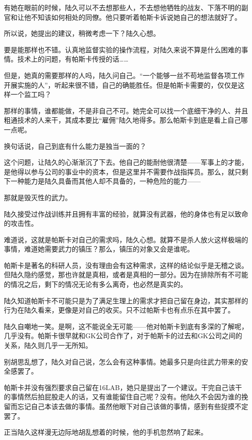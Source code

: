 有她在眼前的时候，陆久可以不去想那些人，不去想他牺牲的战友、下落不明的副官和让他不知该如何相处的同僚。他只要听着帕斯卡诉说她自己的想法就好了。

所以说，她提出的建议，稍微考虑一下？陆久心想。

要是能那样也不错。认真地监督实验的操作流程，对陆久来说不算是什么困难的事情。技术上的问题，有帕斯卡传授的话……

但是，她真的需要那样的人吗，陆久问自己。“一个能够一丝不苟地监督各项工作开展实施的人”，听起来很不错，自己的确能胜任。但是帕斯卡需要的，仅仅是这样一个监工吗？

那样的事情，谁都能做，不是非自己不可。她完全可以找一个底细干净的人、并且粗通技术的人来干，其成本要比“雇佣”陆久地得多。那么帕斯卡到底是看上自己哪一点呢。

换句话说，自己到底有什么能力是独当一面的？

这个问题，让陆久的心渐渐沉了下去。他自己的能耐他很清楚——军事上的才能，是他得以参与公司的事业中的资本，但是这里并不需要作战指挥员。那么，就只剩下一种能力是陆久具备而其他人却不具备的，一种危险的能力——

那就是毁灭性的武力。

陆久接受过作战训练并且拥有丰富的经验，就算没有武器，他的身体也有足以致命的攻击性。

难道说，这就是帕斯卡对自己的需求吗，陆久心想。就算不是杀人放火这样极端的事情，难道她需要武力的镇压？那么，镇压的对象又会是谁呢。

帕斯卡是著名的科研人员，没有理由会有这种需求，这样的结论似乎是无稽之谈。但陆久隐约感觉，那也许就是真相，或者是真相的一部分。因为在排除所有不可能的情况之后，剩下的情况无论有多么离奇，也必然是真实的。

陆久知道帕斯卡不可能只是为了满足生理上的需求才把自己留在身边，其实那样的行为在陆久看来，更像是对自己的收买。只不过帕斯卡也有点乐在其中罢了。

陆久自嘲地一笑。是啊，这不能说全无可能——他对帕斯卡到底有多深的了解呢，几乎没有。帕斯卡很早就和GK公司合作了，对于帕斯卡的过去和GK公司之间的关系，陆久则几乎一无所知。

别胡思乱想了，陆久对自己说，怎么会有这种事情。她最多只是向往武力带来的安全感罢了。

帕斯卡并没有强烈要求自己留在16LAB，她只是提出了一个建议。干完自己该干的事情然后拍屁股走人的话，又有谁能留住自己呢？没有。他陆久不会因为谁的挽留而忘记自己本该去做的事情。虽然他眼下对自己该做的事情，感到有些捉摸不定罢了。

正当陆久这样漫无边际地胡乱想着的时候，他的手机忽然响了起来。

